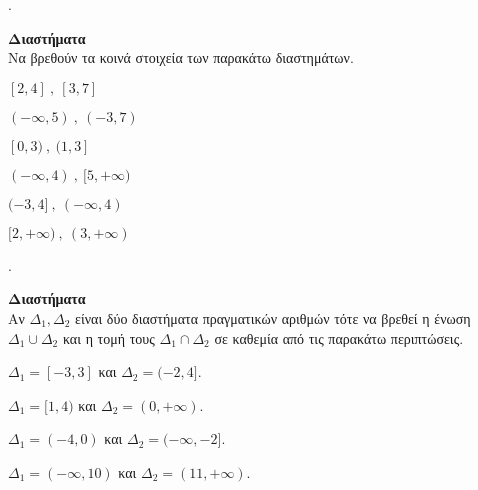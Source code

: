 \documentclass[11pt,a4paper,twocolumn]{article}
\newcounter{askhsh}
\newcommand{\askhsh}{\large\theaskhsh.\ \addtocounter{askhsh}{1}}
\begin{document}
\begin{multicols}{2}
\begin{rlist}
\item \tikzitem{}
\item \tikzitem{}
\item \tikzitem{}
\item \tikzitem{}
\end{rlist}
\end{multicols}
\vspace{-5mm}
\askhsh \textbf{Διαστήματα}\\
Να βρεθούν τα κοινά στοιχεία των παρακάτω διαστημάτων.
\begin{multicols}{2}
\begin{rlist}
\item $ [2,4]\ ,\ [3,7] $
\item $ (-\infty,5)\ ,\ (-3,7) $
\item $ [0,3)\ ,\ (1,3] $
\item $ (-\infty,4)\ ,\ [5,+\infty) $
\item $ (-3,4]\ ,\ (-\infty,4) $
\item $ [2,+\infty)\ ,\ (3,+\infty) $
\end{rlist}
\end{multicols}
\askhsh \textbf{Διαστήματα}\\
Αν $ \varDelta_1,\varDelta_2 $ είναι δύο διαστήματα πραγματικών αριθμών τότε να βρεθεί η ένωση $ \varDelta_1\cup\varDelta_2 $ και η τομή τους $ \varDelta_1\cap\varDelta_2 $ σε καθεμία από τις παρακάτω περιπτώσεις.
\begin{rlist}
\item $ \varDelta_1=[-3,3] $ και $ \varDelta_2=(-2,4] $.
\item $ \varDelta_1=[1,4) $ και $ \varDelta_2=(0,+\infty) $.
\item $ \varDelta_1=(-4,0) $ και $ \varDelta_2=(-\infty,-2] $.
\item $ \varDelta_1=(-\infty,10) $ και $ \varDelta_2=(11,+\infty) $.
\end{rlist}
\end{document}
